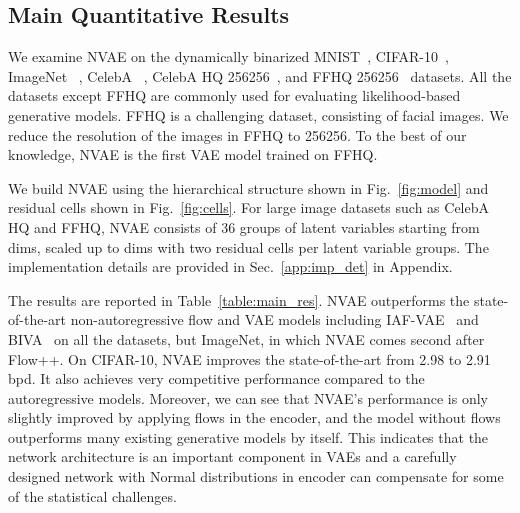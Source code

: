 \documentclass{article}
\begin{document}
\subsection{Main Quantitative Results}\label{sec:main_res}
We examine NVAE on the dynamically binarized MNIST~\cite{lecun1998mnist}, CIFAR-10~\cite{krizhevsky2009cifar}, ImageNet ~\cite{deng2009imagenet}, CelebA ~\cite{liu2015celeba, larsen2016autoencoding}, CelebA HQ 256256~\cite{karras2018progressive}, and FFHQ 256256~\cite{karras2019style} datasets. All the datasets except FFHQ are commonly used for evaluating likelihood-based generative models. FFHQ is a challenging dataset, consisting of facial images. We reduce the resolution of the images in FFHQ to 256256. To the best of our knowledge, NVAE is the first VAE model trained on FFHQ. 

We build NVAE using the hierarchical structure shown in Fig.~\ref{fig:model} and residual cells shown in Fig.~\ref{fig:cells}.
For large image datasets such as CelebA HQ and FFHQ, NVAE consists of 36 groups of latent variables starting from  dims, scaled up to  dims with two residual cells per latent variable groups. The implementation details are provided in Sec.~\ref{app:imp_det} in Appendix.

The results are reported in Table~\ref{table:main_res}. NVAE outperforms the state-of-the-art non-autoregressive flow and VAE models including IAF-VAE~\cite{kingma2016improved} and BIVA~\cite{maaloe2019biva} on all the datasets, but ImageNet, in which NVAE comes second after Flow++\cite{ho19flow++}. On CIFAR-10, NVAE improves the state-of-the-art from 2.98 to 2.91 bpd. It also achieves very competitive performance compared to the autoregressive models.  Moreover, we can see that NVAE's performance is only slightly improved by applying flows in the encoder, and the model without flows outperforms many existing generative models by itself. This indicates that the network architecture is an important component in VAEs and a carefully designed network with Normal distributions in encoder can compensate for some of the statistical challenges.
\end{document}
